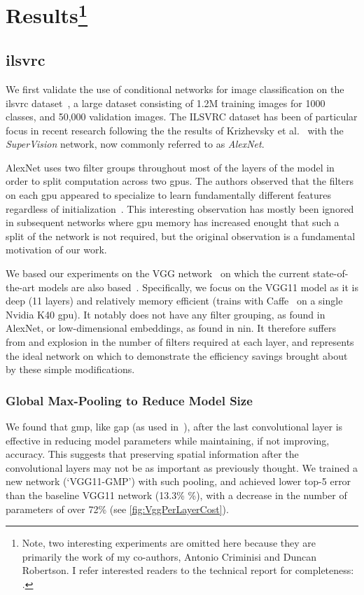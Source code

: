 \documentclass[thesis]{subfiles}
\begin{document}
	\section[Results]{Results\protect\footnote{Note, two interesting experiments are omitted here because they are primarily the work of my co-authors, Antonio Criminisi and Duncan Robertson. I refer interested readers to the technical report for completeness: \citet{Ioannou2015}.}}
	\subsection{\acrlong{ilsvrc}}
	We first validate the use of conditional networks for image classification on the \gls{ilsvrc} dataset~\citep{ILSVRC2015}, a large dataset consisting of 1.2M training images for 1000 classes, and 50,000 validation images. The ILSVRC dataset has been of particular focus in recent research following the the results of Krizhevsky et al.~\citep{Krizhevsky2012} with the \emph{SuperVision} network, now commonly referred to as \emph{AlexNet}.
	
	AlexNet uses two filter groups throughout most of the layers of the model in order to split computation across two \gls{gpu}s. The authors observed that the filters on each \gls{gpu} appeared to specialize to learn fundamentally different features regardless of initialization~\citep{Krizhevsky2012}. This interesting observation has mostly been ignored in subsequent networks where \gls{gpu} memory has increased enought that such a split of the network is not required, but the original observation is a fundamental motivation of our work.
	
	We based our experiments on the VGG network~\citep{Simonyan2014verydeep} on which the current state-of-the-art models are also based~\citep{He2015b}. Specifically, we focus on the VGG11 model as it is deep (11 layers) and relatively memory efficient (trains with Caffe~\citep{Jia2014} on a single Nvidia K40 \gls{gpu}). It notably does not have any filter grouping, as found in AlexNet, or low-dimensional embeddings, as found in \gls{nin}. It therefore suffers from and explosion in the number of filters required at each layer, and represents the ideal network on which to demonstrate the efficiency savings brought about by these simple modifications.
	
	\subsubsection{Global Max-Pooling to Reduce Model Size}
	We found that \gls{gmp}, like \gls{gap} (as used in~\citep{Lin2013NiN,Szegedy2014going}), after the last convolutional layer is effective in reducing model parameters while maintaining, if not improving, accuracy. This suggests that preserving spatial information after the convolutional layers may not be as important as previously thought. 
	We trained a new network (`VGG11-GMP') with such pooling, and achieved lower top-5 error than the baseline VGG11 
	network (13.3\% \%), with a decrease in the number of parameters of over 72\% (see \cref{fig:VggPerLayerCost}).
	
\end{document}
